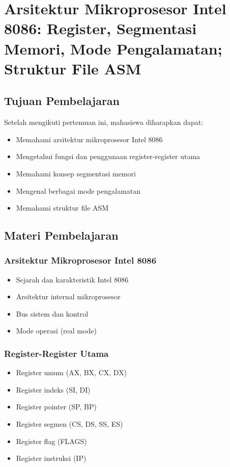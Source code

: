 \chapter{Arsitektur Mikroprosesor Intel 8086: Register, Segmentasi Memori, Mode Pengalamatan; Struktur File ASM}

\section{Tujuan Pembelajaran}
Setelah mengikuti pertemuan ini, mahasiswa diharapkan dapat:
\begin{itemize}
\item Memahami arsitektur mikroprosesor Intel 8086
\item Mengetahui fungsi dan penggunaan register-register utama
\item Memahami konsep segmentasi memori
\item Mengenal berbagai mode pengalamatan
\item Memahami struktur file ASM
\end{itemize}

\section{Materi Pembelajaran}

\subsection{Arsitektur Mikroprosesor Intel 8086}
\begin{itemize}
\item Sejarah dan karakteristik Intel 8086
\item Arsitektur internal mikroprosesor
\item Bus sistem dan kontrol
\item Mode operasi (real mode)
\end{itemize}

\subsection{Register-Register Utama}
\begin{itemize}
\item Register umum (AX, BX, CX, DX)
\item Register indeks (SI, DI)
\item Register pointer (SP, BP)
\item Register segmen (CS, DS, SS, ES)
\item Register flag (FLAGS)
\item Register instruksi (IP)
\end{itemize}

